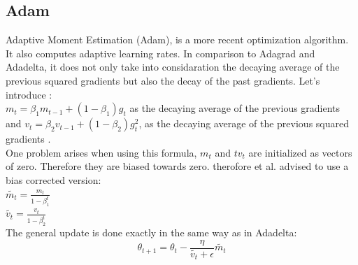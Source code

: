 \subsection{Adam}
Adaptive Moment Estimation (Adam), is a more recent optimization algorithm. It also computes adaptive learning rates. In comparison to Adagrad and Adadelta, it does not only take into considaration the decaying average of the previous squared gradients but also the decay of the past gradients. 
Let's introduce : \\
$m_t = \beta_1 m_{t-1} + (1- \beta_1) g_t $ as the decaying average of the previous gradients  \\
and $v_t = \beta_2 v_{t-1} + (1- \beta_2) g^2_t $, as the decaying average of the previous squared gradients . \\
One problem arises when using this formula, $m_t$  and $tv_t$ are initialized as vectors of zero. Therefore they are biased towards zero. therofore et al. advised to use a bias corrected version:\\
$ \tilde{m_t} = \frac{m_t}{1-\beta^t_1}$\\
$ \tilde{v_t} = \frac{v_t}{1-\beta^t_2}$\\
The general update is done exactly in the same way as in Adadelta:
\begin{equation}
\theta_{t+1} = \theta_t - \frac{\eta}{\tilde{v_t}+ \epsilon} \tilde{m_t}
\end{equation}



